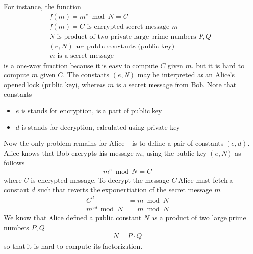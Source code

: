 ﻿For instance, the function
\begin{align*}
    &f(m) = m^e \bmod N = C \\
    &f(m) = C \text{ is encrypted secret message } m \\
    &N \text{ is product of two private large prime numbers } P,Q \\
    &(e, N) \text{ are public constants (public key)} \\
    &m \text{ is a secret message}
\end{align*}
is a one-way function because it is easy to compute $C$ given $m$, but it is hard to compute $m$ given $C$.
The constants $(e, N)$ may be interpreted as an Alice's opened lock (public key),
whereas $m$ is a secret message from Bob.
Note that constants
\begin{itemize}
    \item $e$ is stands for encryption, is a part of public key
    \item $d$ is stands for decryption, calculated using private key
\end{itemize}
Now the only problem remains for Alice -- is to define a pair of constants $(e, d)$.
Alice knows that Bob encrypts his message $m$, using the public key $(e, N)$ as follows
\begin{align*}
    m^e \bmod N = C
\end{align*}
where $C$ is encrypted message.
To decrypt the message $C$ Alice must fetch a constant $d$ such that reverts the exponentiation of the
secret message $m$
\begin{align*}
    C^d            &= m \bmod N \\
    m^{ed} \bmod N &= m \bmod N
\end{align*}
We know that Alice defined a public constant $N$ as a product of two large prime numbers $P, Q$
\begin{align*}
    N = P \cdot Q
\end{align*}
so that it is hard to compute its factorization.

